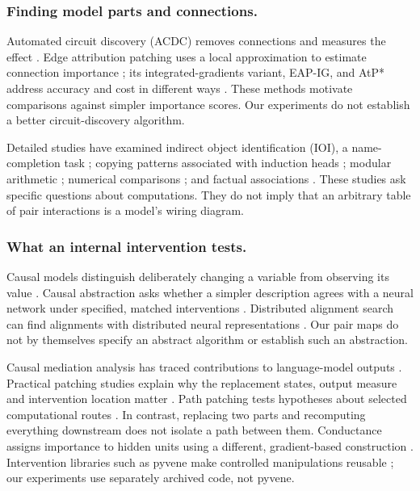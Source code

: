 \documentclass[11pt,letterpaper]{article}
\begin{document}
\subsubsection*{Finding model parts and connections.}
Automated circuit discovery (ACDC) removes connections and measures the effect
\cite{conmy2023acdc}. Edge attribution patching uses a local approximation
to estimate connection importance \cite{syed2024attributionpatching}; its
integrated-gradients variant, EAP-IG, and AtP* address accuracy and cost in
different ways \cite{hanna2024faithfulness,kramar2024atp}.
These methods motivate comparisons against simpler importance scores. Our
experiments do not establish a better circuit-discovery algorithm.

Detailed studies have examined indirect object identification (IOI), a
name-completion task \cite{wang2023ioi}; copying patterns associated with
induction heads \cite{olsson2022induction}; modular arithmetic
\cite{nanda2023grokking}; numerical comparisons \cite{hanna2023greaterthan};
and factual associations \cite{meng2022rome}. These studies ask specific
questions about computations. They do not imply that an arbitrary table of
pair interactions is a model's wiring diagram.

\subsubsection*{What an internal intervention tests.}
Causal models distinguish deliberately changing a variable from observing
its value \cite{pearl2009causality}. Causal abstraction asks whether a
simpler description agrees with a neural network under specified, matched
interventions \cite{geiger2021causalabstractions,geiger2025causalabstraction}.
Distributed alignment search can find alignments with distributed neural
representations \cite{geiger2024distributedalignment}. Our pair maps do not
by themselves specify an abstract algorithm or establish such an abstraction.

Causal mediation analysis has traced contributions to language-model outputs
\cite{vig2020causalmediation}. Practical patching studies explain why the
replacement states, output measure and intervention location matter
\cite{zhang2024patchingpractices,heimersheim2024activationpatching}.
Path patching tests hypotheses about selected computational routes
\cite{goldowskydill2023pathpatching}. In contrast, replacing two parts and
recomputing everything downstream does not isolate a path between them.
Conductance assigns importance to hidden units using a different,
gradient-based construction \cite{dhamdhere2019neuron}. Intervention
libraries such as pyvene make controlled manipulations reusable
\cite{wu2024pyvene}; our experiments use separately archived code, not pyvene.
\end{document}
